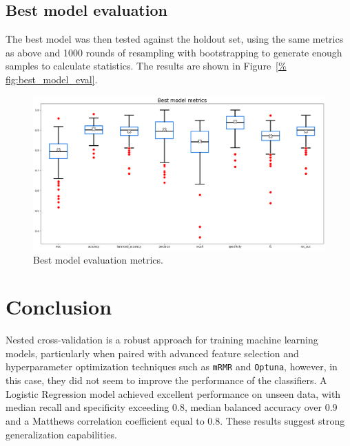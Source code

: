 \documentclass[12pt]{article}
\begin{document}
\subsection{Best model evaluation}

The best model was then tested against the holdout set, using the same metrics
as above and 1000 rounds of resampling with bootstrapping to generate enough
samples to calculate statistics. The results are shown in Figure~\ref{%
fig:best_model_eval}.

\begin{figure}[H]
    \centering
    \includegraphics[width=\textwidth]{ims/best.png}
    \caption{Best model evaluation metrics.}
    \label{fig:best_model_eval}
\end{figure}



\section{Conclusion}

Nested cross-validation is a robust approach for training machine learning
models, particularly when paired with advanced feature selection and
hyperparameter optimization techniques such as \texttt{mRMR} and
\texttt{Optuna}, however, in this case, they did not seem to improve the
performance of the classifiers. A Logistic Regression model achieved excellent
performance on unseen data, with median recall and specificity exceeding 0.8,
median balanced accuracy over 0.9 and a Matthews correlation coefficient equal
to 0.8. These results suggest strong generalization capabilities.
\end{document}
